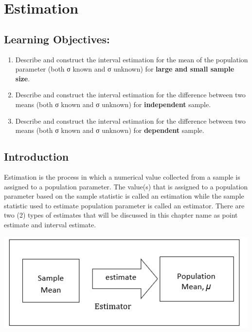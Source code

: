 \documentclass[
  a4paper,
  DIV=11,
  numbers=noendperiod,
  oneside]{scrreprt}
\providecommand{\tightlist}{%
  \setlength{\itemsep}{0pt}\setlength{\parskip}{0pt}}\usepackage{longtable,booktabs,array}
\begin{document}
\hypertarget{estimation}{%
\chapter{Estimation}\label{estimation}}

\hypertarget{learning-objectives-2}{%
\section*{Learning Objectives:}\label{learning-objectives-2}}


\begin{enumerate}
\def\labelenumi{\arabic{enumi}.}
\tightlist
\item
  Describe and construct the interval estimation for the mean of the
  population parameter (both σ known and σ unknown) for \textbf{large
  and small sample size}.
\item
  Describe and construct the interval estimation for the difference
  between two means (both σ known and σ unknown) for
  \textbf{independent} sample.
\item
  Describe and construct the interval estimation for the difference
  between two means (both σ known and σ unknown) for \textbf{dependent}
  sample.
\end{enumerate}

\hypertarget{introduction-2}{%
\section{Introduction}\label{introduction-2}}

Estimation is the process in which a numerical value collected from a
sample is assigned to a population parameter. The value(s) that is
assigned to a population parameter based on the sample statistic is
called an estimation while the sample statistic used to estimate
population parameter is called an estimator. There are two (2) types of
estimates that will be discussed in this chapter name as point estimate
and interval estimate.

\includegraphics[width=5.20833in,height=\textheight]{images/ch3/picture1.png}
\end{document}
